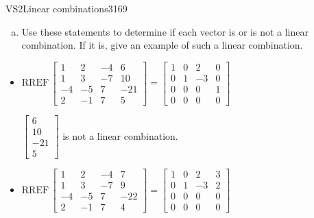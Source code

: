 \begin{exercise}{VS2}{Linear combinations}{3169}
\begin{exerciseStatement}
\begin{enumerate}[(a)]
\begin{itemize}
 
\end{itemize}

     
\item  

 Use these statements to determine if each vector is or is not a linear combination. If it is, give an example of such a linear combination. 

 
\end{enumerate}

     \end{exerciseStatement}
 \begin{exerciseAnswer} 

\begin{itemize}
\item  

 \(
\mathrm{RREF}\, \left[\begin{array}{ccc|c}
1 & 2 & -4 & 6 \\
1 & 3 & -7 & 10 \\
-4 & -5 & 7 & -21 \\
2 & -1 & 7 & 5
\end{array}\right] = \left[\begin{array}{ccc|c}
1 & 0 & 2 & 0 \\
0 & 1 & -3 & 0 \\
0 & 0 & 0 & 1 \\
0 & 0 & 0 & 0
\end{array}\right]
                        \) 

 

 \(\left[\begin{array}{c}
6 \\
10 \\
-21 \\
5
\end{array}\right]\) is not a linear combination. 

 
\item  

 \(
\mathrm{RREF}\, \left[\begin{array}{ccc|c}
1 & 2 & -4 & 7 \\
1 & 3 & -7 & 9 \\
-4 & -5 & 7 & -22 \\
2 & -1 & 7 & 4
\end{array}\right] = \left[\begin{array}{ccc|c}
1 & 0 & 2 & 3 \\
0 & 1 & -3 & 2 \\
0 & 0 & 0 & 0 \\
0 & 0 & 0 & 0
\end{array}\right]
                        \) 


\end{itemize}
\end{exerciseAnswer}
\end{exercise}
